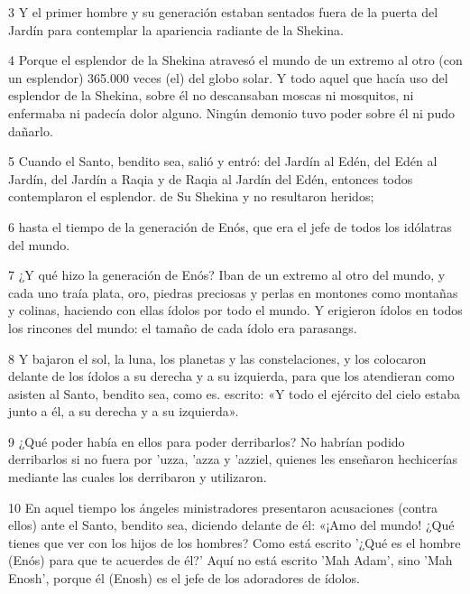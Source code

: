 \par 3 Y el primer hombre y su generación estaban sentados fuera de la puerta del Jardín para contemplar la apariencia radiante de la Shekina.

\par 4 Porque el esplendor de la Shekina atravesó el mundo de un extremo al otro (con un esplendor) 365.000 veces (el) del globo solar. Y todo aquel que hacía uso del esplendor de la Shekina, sobre él no descansaban moscas ni mosquitos, ni enfermaba ni padecía dolor alguno. Ningún demonio tuvo poder sobre él ni pudo dañarlo.

\par 5 Cuando el Santo, bendito sea, salió y entró: del Jardín al Edén, del Edén al Jardín, del Jardín a Raqia y de Raqia al Jardín del Edén, entonces todos contemplaron el esplendor. de Su Shekina y no resultaron heridos;

\par 6 hasta el tiempo de la generación de Enós, que era el jefe de todos los idólatras del mundo.

\par 7 ¿Y qué hizo la generación de Enós? Iban de un extremo al otro del mundo, y cada uno traía plata, oro, piedras preciosas y perlas en montones como montañas y colinas, haciendo con ellas ídolos por todo el mundo. Y erigieron ídolos en todos los rincones del mundo: el tamaño de cada ídolo era parasangs.

\par 8 Y bajaron el sol, la luna, los planetas y las constelaciones, y los colocaron delante de los ídolos a su derecha y a su izquierda, para que los atendieran como asisten al Santo, bendito sea, como es. escrito: «Y todo el ejército del cielo estaba junto a él, a su derecha y a su izquierda».

\par 9 ¿Qué poder había en ellos para poder derribarlos? No habrían podido derribarlos si no fuera por 'uzza, 'azza y 'azziel, quienes les enseñaron hechicerías mediante las cuales los derribaron y utilizaron.

\par 10 En aquel tiempo los ángeles ministradores presentaron acusaciones (contra ellos) ante el Santo, bendito sea, diciendo delante de él: «¡Amo del mundo! ¿Qué tienes que ver con los hijos de los hombres? Como está escrito '¿Qué es el hombre (Enós) para que te acuerdes de él?' Aquí no está escrito 'Mah Adam', sino 'Mah Enosh', porque él (Enosh) es el jefe de los adoradores de ídolos.

